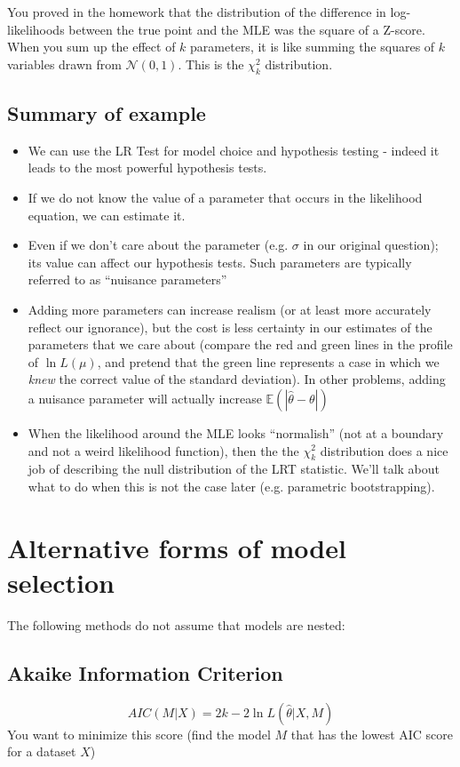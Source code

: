 \documentclass[11pt]{article}
\begin{document}
You proved in the homework that the distribution of the difference in log-likelihoods between the true point and the MLE was the square of a Z-score. When you sum up the effect of $k$ parameters, it is like summing the squares of $k$ variables drawn from $\mathcal{N}(0,1)$.  
This is the $\chi_k^2$ distribution.

\subsection*{Summary of example}
\begin{itemize}
	\item We can use the LR Test for model choice and hypothesis testing - indeed it leads to the most powerful hypothesis tests.
	\item If we do not know the value of a parameter that occurs in the likelihood equation, we can estimate it.
	\item Even if we don't care about the parameter (e.g. $\sigma$ in our original question); its value can affect our hypothesis tests. Such parameters are typically referred to as ``nuisance parameters''
	\item Adding more parameters can increase realism (or at least more accurately reflect our ignorance), but the cost is less certainty in our estimates of the parameters that we care about (compare the red and green lines in the profile of $\ln L(\mu)$, and pretend that the green line represents a case in which we {\em knew} the correct value of the standard deviation).  In other problems, adding a nuisance parameter will actually increase $\mathbb{E}(|\hat\theta - \theta|)$
	\item When the likelihood around the MLE looks ``normalish'' (not at a boundary and not a weird likelihood function), then the the $\chi_k^2$ distribution does a nice job of describing the null distribution of the LRT statistic.  We'll talk about what to do when this is not the case later (e.g. parametric bootstrapping).
\end{itemize}

\section*{Alternative forms of model selection}
The following methods do not assume that models are nested:
\subsection*{Akaike Information Criterion}
	$$AIC(M|X) = 2k - 2 \ln L(\hat\theta | X, M)$$
You want to minimize this score (find the model $M$ that has the lowest AIC score for a dataset $X$)
\end{document}
